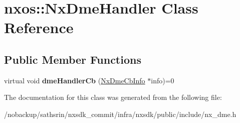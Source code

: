\hypertarget{classnxos_1_1NxDmeHandler}{\section{nxos\-:\-:Nx\-Dme\-Handler Class Reference}
\label{classnxos_1_1NxDmeHandler}
}
\subsection*{Public Member Functions}
\begin{DoxyCompactItemize}
\item 
\hypertarget{classnxos_1_1NxDmeHandler_a41915687d068edc7008c444cba1a9a5d}{virtual void {\bfseries dme\-Handler\-Cb} (\hyperlink{classnxos_1_1NxDmeCbInfo}{Nx\-Dme\-Cb\-Info} $\ast$info)=0}\label{classnxos_1_1NxDmeHandler_a41915687d068edc7008c444cba1a9a5d}

\end{DoxyCompactItemize}


The documentation for this class was generated from the following file\-:\begin{DoxyCompactItemize}
\item 
/nobackup/sathsrin/nxsdk\-\_\-commit/infra/nxsdk/public/include/nx\-\_\-dme.\-h\end{DoxyCompactItemize}
